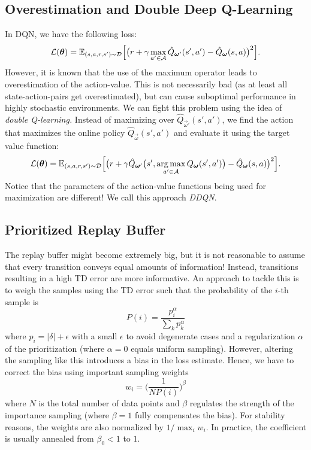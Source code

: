 		\subsection{Overestimation and Double Deep Q-Learning}
			In \ac{DQN}, we have the following loss:
			\begin{equation}
				\mathcal{L}(\bm{\theta}) = \mathbb{E}_{(s, a, r, s') \sim \mathcal{D}}\Bigl[ \bigl( r + \gamma \max_{a' \in \mathcal{A}} \hat{Q}_{\bm{\omega}'}(s', a') - \hat{Q}_{\bm{\omega}}(s, a) \bigr)^2 \Bigr].
			\end{equation}
			However, it is known that the use of the maximum operator leads to overestimation of the action-value. This is not necessarily bad (as at least all state-action-pairs get overestimated), but can cause suboptimal performance in highly stochastic environments. We can fight this problem using the idea of \emph{double Q-learning.} Instead of maximizing over \( \hat{Q}_{\vec{\omega}'}(s', a') \), we find the action that maximizes the online policy \( \hat{Q}_{\vec{\omega}}(s', a') \) and evaluate it using the target value function:
			\begin{equation}
				\mathcal{L}(\bm{\theta}) = \mathbb{E}_{(s, a, r, s') \sim \mathcal{D}}\Bigl[ \bigl( r + \gamma \hat{Q}_{\bm{\omega}'}\bigl( s', \operatorname*{arg\,max}_{a' \in \mathcal{A}} Q_{\bm{\omega}}(s', a') \bigr) - \hat{Q}_{\bm{\omega}}(s, a) \bigr)^2 \Bigr].
			\end{equation}
			Notice that the parameters of the action-value functions being used for maximization are different! We call this approach \emph{\ac{DDQN}}.

		\subsection{Prioritized Replay Buffer}
			The replay buffer might become extremely big, but it is not reasonable to assume that every transition conveys equal amounts of information! Instead, transitions resulting in a high \ac{TD} error are more informative. An approach to tackle this is to weigh the samples using the \ac{TD} error such that the probability of the \(i\)-th sample is
			\begin{equation}
				P(i) = \frac{p_i^\alpha}{\sum_k p_k^\alpha}
			\end{equation}
			where \( p_i = \lvert \delta \rvert + \epsilon \) with a small \(\epsilon\) to avoid degenerate cases and a regularization \(\alpha\) of the prioritization (where \(\alpha = 0\) equals uniform sampling). However, altering the sampling like this introduces a bias in the loss estimate. Hence, we have to correct the bias using important sampling weights
			\begin{equation}
				w_i = \biggl( \frac{1}{N P(i)} \biggr)^\beta
			\end{equation}
			where \(N\) is the total number of data points and \(\beta\) regulates the strength of the importance sampling (where \(\beta = 1\) fully compensates the bias). For stability reasons, the weights are also normalized by \( 1/\max_i w_i \). In practice, the coefficient is usually annealed from \(\beta_0 < 1\) to \(1\).

